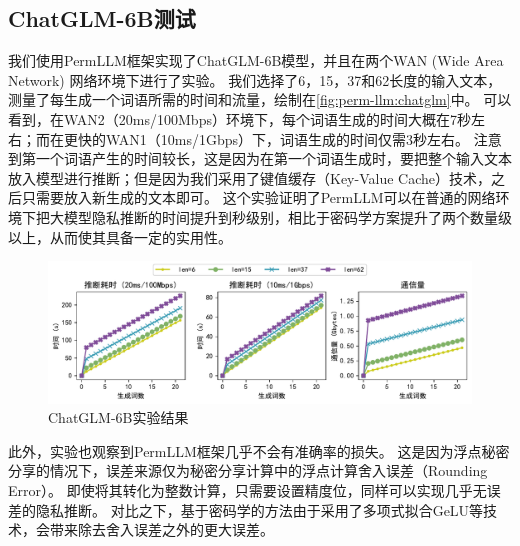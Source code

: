 \subsection{ChatGLM-6B测试}
我们使用PermLLM框架实现了ChatGLM-6B模型，并且在两个WAN (Wide Area Network) 网络环境下进行了实验。
%
我们选择了6，15，37和62长度的输入文本，测量了每生成一个词语所需的时间和流量，绘制在\autoref{fig:perm-llm:chatglm}中。
%
可以看到，在WAN2（20ms/100Mbps）环境下，每个词语生成的时间大概在7秒左右；而在更快的WAN1（10ms/1Gbps）下，词语生成的时间仅需3秒左右。
%
注意到第一个词语产生的时间较长，这是因为在第一个词语生成时，要把整个输入文本放入模型进行推断；但是因为我们采用了键值缓存（Key-Value Cache）技术，之后只需要放入新生成的文本即可。
%
这个实验证明了PermLLM可以在普通的网络环境下把大模型隐私推断的时间提升到秒级别，相比于密码学方案提升了两个数量级以上，从而使其具备一定的实用性。
%

\begin{figure}[htbp]
    \centering
    \includegraphics[width=\linewidth]{Z_Resources/perm-llm_ChatGLM.pdf}
    \caption{ChatGLM-6B实验结果}
    \label{fig:perm-llm:chatglm}
\end{figure}


此外，实验也观察到PermLLM框架几乎不会有准确率的损失。
%
这是因为浮点秘密分享的情况下，误差来源仅为秘密分享计算中的浮点计算舍入误差（Rounding Error）。
%
即使将其转化为整数计算，只需要设置精度位，同样可以实现几乎无误差的隐私推断。
%
对比之下，基于密码学的方法由于采用了多项式拟合GeLU等技术，会带来除去舍入误差之外的更大误差。